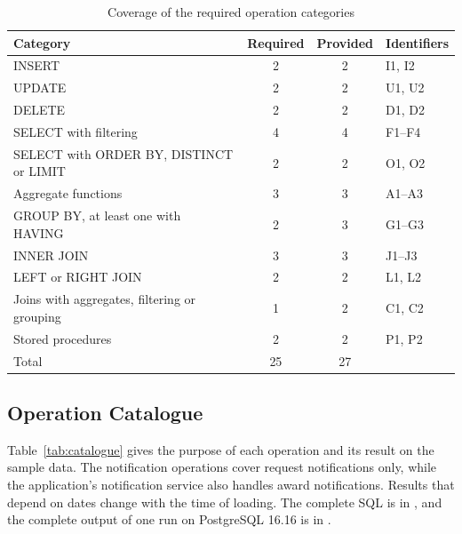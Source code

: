 \documentclass[11pt,letterpaper]{article}
\begin{document}
\begin{table}[!ht]
\centering\small
\caption{Coverage of the required operation categories}
\label{tab:categories}
\begin{tabular}{@{}lccl@{}}
\toprule
Category & Required & Provided & Identifiers \\
\midrule
INSERT & 2 & 2 & I1, I2 \\
UPDATE & 2 & 2 & U1, U2 \\
DELETE & 2 & 2 & D1, D2 \\
SELECT with filtering & 4 & 4 & F1--F4 \\
SELECT with ORDER BY, DISTINCT or LIMIT & 2 & 2 & O1, O2 \\
Aggregate functions & 3 & 3 & A1--A3 \\
GROUP BY, at least one with HAVING & 2 & 3 & G1--G3 \\
INNER JOIN & 3 & 3 & J1--J3 \\
LEFT or RIGHT JOIN & 2 & 2 & L1, L2 \\
Joins with aggregates, filtering or grouping & 1 & 2 & C1, C2 \\
Stored procedures & 2 & 2 & P1, P2 \\
\midrule
Total & 25 & 27 & \\
\bottomrule
\end{tabular}
\end{table}

\subsection{Operation Catalogue}
Table~\ref{tab:catalogue} gives the purpose of each operation and its result on the sample data. The notification operations cover request notifications only, while the application's notification service also handles award notifications. Results that depend on dates change with the time of loading. The complete SQL is in , and the complete output of one run on PostgreSQL 16.16 is in .
\end{document}
